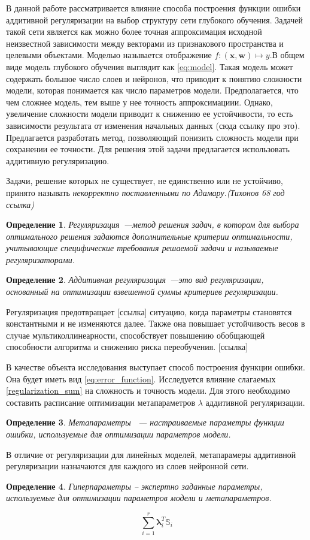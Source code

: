 \documentclass[12pt, twoside]{article}
\newcommand{\xb}{{\mathbf{x}}}
\newcommand{\wm}{{\mathbf{w}}}
\newtheorem{definition}{Определение}
\begin{document}
В данной работе рассматривается влияние способа построения функции ошибки аддитивной регуляризации на выбор структуру сети глубокого обучения. Задачей такой сети является как можно более точная аппроксимация исходной неизвестной зависимости между векторами из признакового пространства и целевыми объектами.  Моделью называется отображение $f:(\xb,\wm)\mapsto y$.В общем виде модель глубокого обучения выглядит как \eqref{eq:model}. Такая модель может содержать большое число слоев и нейронов, что приводит к понятию сложности модели, которая понимается как число параметров модели. Предполагается, что чем сложнее модель, тем выше у нее точность аппроксимациии. Однако, увеличение сложности модели приводит к снижению ее устойчивости, то есть зависимости результата от изменения начальных данных (сюда ссылку про это). Предлагается разработать метод, позволяющий понизить сложность модели при сохранении ее точности.
Для решения этой задачи предлагается использовать аддитивную регуляризацию. 

Задачи, решение которых не существует, не единственно или не устойчиво, принято называть \textit{некорректно поставленными по Адамару.(Тихонов 68 год ссылка)} 
\begin{definition}%
Регуляризация~---метод решения задач, в котором для выбора оптимального решения задаются дополнительные критерии
оптимальности, учитывающие специфические требования решаемой задачи и называемые регуляризаторами. 
\end{definition}
\begin{definition}%
Аддитивная регуляризация~---это вид регуляризации, основанный на оптимизации взвешенной суммы критериев регуляризации. 
\end{definition}
Регуляризация предотвращает [ссылка] ситуацию, когда параметры становятся константными и не изменяются далее. Также она повышает устойчивость весов в случае мультиколлинеарности,
способствует повышению обобщающей способности алгоритма и снижению риска переобучения. [ссылка]

В качестве объекта исследования выступает способ построения функции ошибки. Она будет иметь вид \eqref{eq:error_function}. Исследуется влияние слагаемых \eqref{regularization_sum} на сложность и точность модели. Для этого необходимо составить расписание оптимизации метапараметров $\lambda$ аддитивной регуляризации.
\begin{definition}%
Метапараметры ~--- настраиваемые параметры функции ошибки, используемые для оптимизации параметров модели.
\end{definition}
В отличие от регуляризации для линейных моделей, метапарамеры аддитивной регуляризации назначаются для каждого из слоев нейронной сети. 
\begin{definition}%
Гиперпараметры -- экспертно заданные параметры, используемые для оптимизации параметров модели и метапараметров.
\end{definition}
\begin{equation}\label{regularization_sum}
\sum\limits_{i=1}^r \mathbf{\lambda}_i^T\mathbb{S}_i    
\end{equation}
\end{document}
